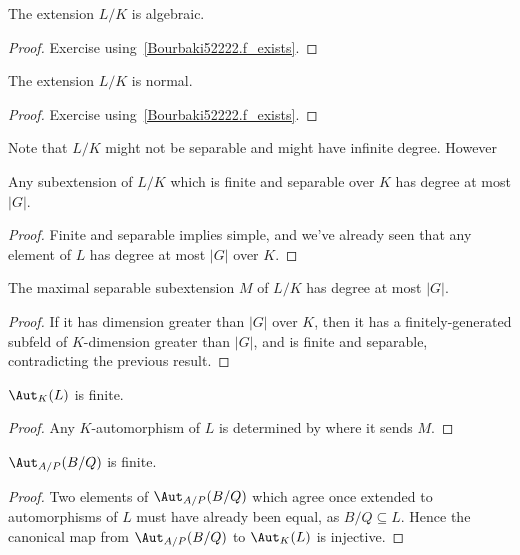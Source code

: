 \begin{corollary}
  \label{Bourbaki52222.algebraic}
  \leanok
  The extension $L/K$ is algebraic.
\end{corollary}
\begin{proof}
  \leanok
  Exercise using~\ref{Bourbaki52222.f_exists}.
\end{proof}

\begin{corollary}
  \leanok
  The extension $L/K$ is normal.
\end{corollary}
\begin{proof}
  \leanok
  Exercise using~\ref{Bourbaki52222.f_exists}.
\end{proof}

Note that $L/K$ might not be separable and might have infinite degree. However

\begin{corollary}
  \label{Bourbaki52222.finite_separable_subextension_finrank_le}
  Any subextension of $L/K$ which is finite and separable over $K$
  has degree at most $|G|$.
  \leanok
\end{corollary}
\begin{proof}
  \leanok
  Finite and separable implies simple, and we've already seen that any
  element of $L$ has degree at most $|G|$ over $K$.
\end{proof}

\begin{corollary}
  \label{Bourbaki52222.separableClosure_finrank_le}
  The maximal separable subextension $M$ of $L/K$ has degree at most $|G|$.
  \leanok
\end{corollary}
\begin{proof}
  \leanok
  If it has dimension greater than $|G|$ over $K$, then it has a finitely-generated
  subfeld of $K$-dimension greater than $|G|$, and is finite and separable, contradicting
  the previous result.
\end{proof}

\begin{corollary} $\Aut_K(L)$ is finite.
  \leanok
\end{corollary}
\begin{proof}
  \leanok
  Any $K$-automorphism of $L$ is determined by where it sends $M$.
\end{proof}

\begin{corollary} $\Aut_{A/P}(B/Q)$ is finite.
  \leanok
\end{corollary}
\begin{proof}
  \leanok
  Two elements of $\Aut_{A/P}(B/Q)$ which agree once extended to automorphisms of $L$
  must have already been equal, as $B/Q\subseteq L$. Hence the canonical map
  from $\Aut_{A/P}(B/Q)$ to $\Aut_K(L)$ is injective.
\end{proof}

